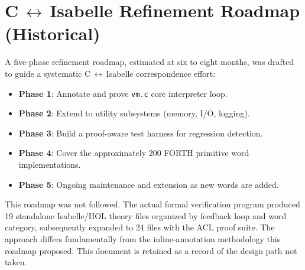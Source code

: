 
\section*{C\,$\leftrightarrow$\,Isabelle Refinement Roadmap (Historical)}

A five-phase refinement roadmap, estimated at six to eight months, was drafted
to guide a systematic C\,$\leftrightarrow$\,Isabelle correspondence effort:

\begin{itemize}
  \item \textbf{Phase 1}: Annotate and prove \texttt{vm.c} core interpreter loop.
  \item \textbf{Phase 2}: Extend to utility subsystems (memory, I/O, logging).
  \item \textbf{Phase 3}: Build a proof-aware test harness for regression detection.
  \item \textbf{Phase 4}: Cover the approximately 200 FORTH primitive word implementations.
  \item \textbf{Phase 5}: Ongoing maintenance and extension as new words are added.
\end{itemize}

This roadmap was not followed. The actual formal verification program produced
19 standalone Isabelle/HOL theory files organized by feedback loop and word
category, subsequently expanded to 24 files with the ACL proof suite. The
approach differs fundamentally from the inline-annotation methodology this
roadmap proposed. This document is retained as a record of the design path not
taken.
